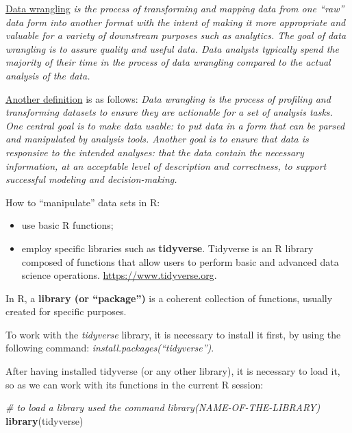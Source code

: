 \documentclass[
]{article}
\newenvironment{Shaded}{\begin{snugshade}}{\end{snugshade}}
\newcommand{\CommentTok}[1]{\textcolor[rgb]{0.56,0.35,0.01}{\textit{#1}}}
\newcommand{\KeywordTok}[1]{\textcolor[rgb]{0.13,0.29,0.53}{\textbf{#1}}}
\newcommand{\NormalTok}[1]{#1}
\providecommand{\tightlist}{%
  \setlength{\itemsep}{0pt}\setlength{\parskip}{0pt}}
\begin{document}
\href{https://en.wikipedia.org/wiki/Data_wrangling}{Data wrangling} \emph{is the process of transforming and mapping data from one ``raw'' data form into another format with the intent of making it more appropriate and valuable for a variety of downstream purposes such as analytics. The goal of data wrangling is to assure quality and useful data. Data analysts typically spend the majority of their time in the process of data wrangling compared to the actual analysis of the data.}

\href{https://link.springer.com/referenceworkentry/10.1007\%2F978-3-319-63962-8_9-1}{Another definition} is as follows: \emph{Data wrangling is the process of profiling and transforming datasets to ensure they are actionable for a set of analysis tasks. One central goal is to make data usable: to put data in a form that can be parsed and manipulated by analysis tools. Another goal is to ensure that data is responsive to the intended analyses: that the data contain the necessary information, at an acceptable level of description and correctness, to support successful modeling and decision-making.}

How to ``manipulate'' data sets in R:

\begin{itemize}
\tightlist
\item
  use basic R functions;
\item
  employ specific libraries such as \textbf{tidyverse}. Tidyverse is an R library composed of functions that allow users to perform basic and advanced data science operations. \url{https://www.tidyverse.org}.
\end{itemize}

In R, a \textbf{library (or ``package'')} is a coherent collection of functions, usually created for specific purposes.

To work with the \emph{tidyverse} library, it is necessary to install it first, by using the following command: \emph{install.packages(``tidyverse'')}.

After having installed tidyverse (or any other library), it is necessary to load it, so as we can work with its functions in the current R session:

\begin{Shaded}
\begin{Highlighting}[]
\CommentTok{# to load a library used the command library(NAME-OF-THE-LIBRARY)}
\KeywordTok{library}\NormalTok{(tidyverse)}
\end{Highlighting}
\end{Shaded}
\end{document}
